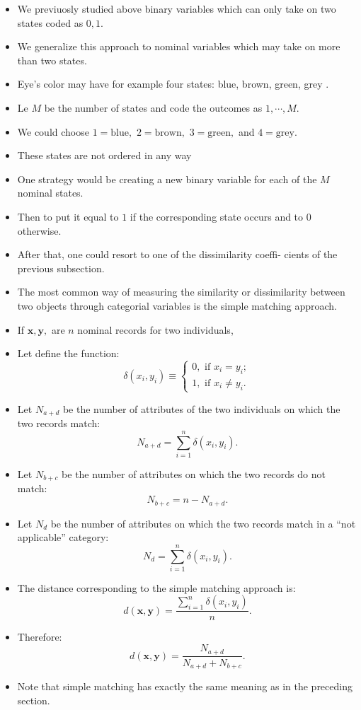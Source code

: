 \documentclass[
]{article}
\begin{document}
\begin{itemize}
\item
  We previuosly studied above binary variables which can only take on
  two states coded as \(0,1\).
\item
  We generalize this approach to nominal variables which may take on
  more than two states.
\item
  Eye's color may have for example four states: blue, brown, green, grey
  .
\item
  Le \(M\) be the number of states and code the outcomes as
  \(1, \cdots, M\).
\item
  We could choose \(1 =\text{blue},\) \(2 =\text{brown},\)
  \(3 =\text{green},\) and \(4 =\text{grey}\).
\item
  These states are not ordered in any way
\item
  One strategy would be creating a new binary variable for each of the
  \(M\) nominal states.
\item
  Then to put it equal to \(1\) if the corresponding state occurs and to
  \(0\) otherwise.
\item
  After that, one could resort to one of the dissimilarity coeffi-
  cients of the previous subsection.
\item
  The most common way of measuring the similarity or dissimilarity
  between two objects through categorial variables is the simple
  matching approach.
\item
  If \(\bm{x},\bm{y},\) are \(n\) nominal records for two individuals,
\item
  Let define the function: \[\delta(x_i,y_i)\equiv \begin{cases}0,
  \text{ if } x_i=y_i;\\1,\text{ if } x_i \neq y_i.\end{cases}\]
\item
  Let \(N_{a+d}\) be the number of attributes of the two individuals on
  which the two records match: \[N_{a+d}=\sum_{i=1}^n\delta(x_i,y_i).\]
\item
  Let \(N_{b+c}\) be the number of attributes on which the two records
  do not match: \[N_{b+c}= n - N_{a+d}.\]
\item
  Let \(N_d\) be the number of attributes on which the two records match
  in a ``not applicable'' category:
  \[N_{d}=\sum_{i=1}^n\delta(x_i,y_i).\]
\item
  The distance corresponding to the simple matching approach is: \[
  d(\bm{x},\bm{y})=\frac{\sum_{i=1}^n\delta(x_i,y_i)}{n}.
  \]
\item
  Therefore: \[d(\bm{x},\bm{y})=\frac{N_{a+d}}{N_{a+d}+N_{b+c}}.\]
\item
  Note that simple matching has exactly the same meaning as in the
  preceding section.
\end{itemize}
\end{document}
